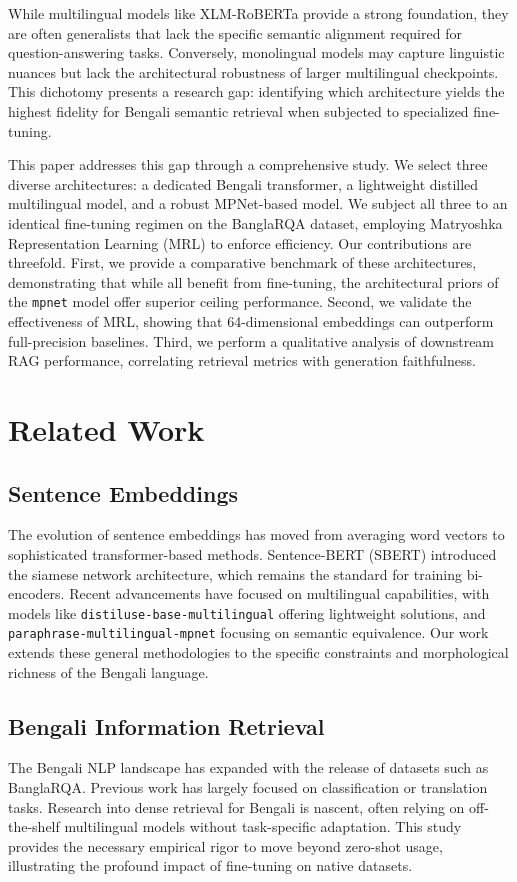 \documentclass[10pt, conference, compsocconf]{IEEEtran}
\begin{document}
While multilingual models like XLM-RoBERTa provide a strong foundation, they are often generalists that lack the specific semantic alignment required for question-answering tasks. Conversely, monolingual models may capture linguistic nuances but lack the architectural robustness of larger multilingual checkpoints. This dichotomy presents a research gap: identifying which architecture yields the highest fidelity for Bengali semantic retrieval when subjected to specialized fine-tuning.

This paper addresses this gap through a comprehensive study. We select three diverse architectures: a dedicated Bengali transformer, a lightweight distilled multilingual model, and a robust MPNet-based model. We subject all three to an identical fine-tuning regimen on the BanglaRQA dataset, employing Matryoshka Representation Learning (MRL) to enforce efficiency. Our contributions are threefold. First, we provide a comparative benchmark of these architectures, demonstrating that while all benefit from fine-tuning, the architectural priors of the \texttt{mpnet} model offer superior ceiling performance. Second, we validate the effectiveness of MRL, showing that 64-dimensional embeddings can outperform full-precision baselines. Third, we perform a qualitative analysis of downstream RAG performance, correlating retrieval metrics with generation faithfulness.

\section{Related Work}

\subsection{Sentence Embeddings}
The evolution of sentence embeddings has moved from averaging word vectors to sophisticated transformer-based methods. Sentence-BERT (SBERT) introduced the siamese network architecture, which remains the standard for training bi-encoders. Recent advancements have focused on multilingual capabilities, with models like \texttt{distiluse-base-multilingual} offering lightweight solutions, and \texttt{paraphrase-multilingual-mpnet} focusing on semantic equivalence. Our work extends these general methodologies to the specific constraints and morphological richness of the Bengali language.

\subsection{Bengali Information Retrieval}
The Bengali NLP landscape has expanded with the release of datasets such as BanglaRQA. Previous work has largely focused on classification or translation tasks. Research into dense retrieval for Bengali is nascent, often relying on off-the-shelf multilingual models without task-specific adaptation. This study provides the necessary empirical rigor to move beyond zero-shot usage, illustrating the profound impact of fine-tuning on native datasets.
\end{document}
